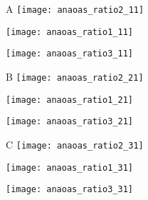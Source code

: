 \begin{figure}[h]
	\centering
    \begin{subfigure}[b]{0.3\textwidth}
    	A
		\centering
        \texttt{[image: anaoas\_ratio2\_11]}
        \label{anaoas_ratio2_11}
	\end{subfigure}
    \hfill
    \begin{subfigure}[b]{0.3\textwidth}
		\centering
        \texttt{[image: anaoas\_ratio1\_11]}
        \label{fig:anaoas_ratio1_11}
	\end{subfigure}
    \hfill
    \begin{subfigure}[b]{0.3\textwidth}
		\centering
        \texttt{[image: anaoas\_ratio3\_11]}
        \label{fig:anaoas_ratio3_11}
	\end{subfigure}
    \begin{subfigure}[b]{0.3\textwidth}
    	B
		\centering
        \texttt{[image: anaoas\_ratio2\_21]}
        \label{fig:anaoas_ratio2_21}
	\end{subfigure}
    \hfill
    \begin{subfigure}[b]{0.3\textwidth}
		\centering
        \texttt{[image: anaoas\_ratio1\_21]}
        \label{fig:anaoas_ratio1_21}
	\end{subfigure}
    \hfill
    \begin{subfigure}[b]{0.3\textwidth}
		\centering
        \texttt{[image: anaoas\_ratio3\_21]}
        \label{fig:anaoas_ratio3_21}
	\end{subfigure}
    \begin{subfigure}[b]{0.3\textwidth}
    	C
		\centering
        \texttt{[image: anaoas\_ratio2\_31]}
        \label{fig:anaoas_ratio2_31}
	\end{subfigure}
    \hfill
    \begin{subfigure}[b]{0.3\textwidth}
		\centering
        \texttt{[image: anaoas\_ratio1\_31]}
        \label{fig:anaoas_ratio1_31}
	\end{subfigure}
    \hfill
    \begin{subfigure}[b]{0.3\textwidth}
		\centering
        \texttt{[image: anaoas\_ratio3\_31]}
        \label{fig:anaoas_ratio3_31}
	\end{subfigure}
    \begin{subfigure}[b]{0.3\textwidth}

\end{subfigure}
\end{figure}
